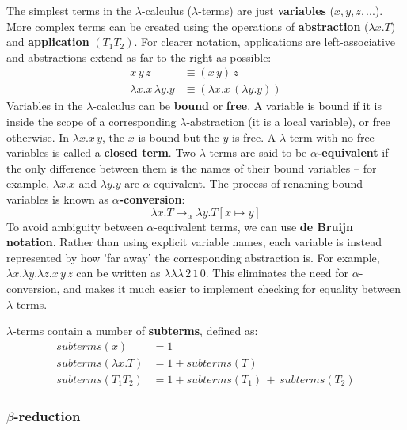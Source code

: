 \documentclass[11pt]{article}
\begin{document}
The simplest terms in the $\lambda$-calculus ($\lambda$-terms) are just \textbf{variables} ($x, y, z, ...$). More complex terms can be created using the operations of \textbf{abstraction} ($\lambda x. T$) and \textbf{application} $(T_1 T_2)$. For clearer notation, applications are left-associative and abstractions extend as far to the right as possible:
%
\begin{align*}
    x \, y \, z &\equiv (x \, y) \, z \\
    \lambda x. x \, \lambda y. y &\equiv (\lambda x. x \, (\lambda y. y))
\end{align*}
%
Variables in the $\lambda$-calculus can be \textbf{bound} or \textbf{free}. A variable is bound if it is inside the scope of a corresponding $\lambda$-abstraction (it is a local variable), or free otherwise. In $\lambda x. x \, y$, the $x$ is bound but the $y$ is free. A $\lambda$-term with no free variables is called a \textbf{closed term}. Two $\lambda$-terms are said to be \textbf{$\alpha$-equivalent} if the only difference between them is the names of their bound variables -- for example, $\lambda x. x$ and $\lambda y. y$ are $\alpha$-equivalent. The process of renaming bound variables is known as \textbf{$\alpha$-conversion}:
%
$$\lambda x. T \to_\alpha \lambda y. T[x \mapsto y]$$
%
To avoid ambiguity between $\alpha$-equivalent terms, we can use \textbf{de Bruijn notation}. Rather than using explicit variable names, each variable is instead represented by how 'far away' the corresponding abstraction is. For example, $\lambda x. \lambda y. \lambda z. x \, y \, z$ can be written as $\lambda\lambda\lambda \, 2 \, 1 \, 0$. This eliminates the need for $\alpha$-conversion, and makes it much easier to implement checking for equality between $\lambda$-terms.

$\lambda$-terms contain a number of \textbf{subterms}, defined as:
%
\begin{align*}
    subterms(x) &= 1 \\
    subterms(\lambda x. T) &= 1 + subterms(T) \\
    subterms(T_1 T_2) &= 1 + subterms(T_1) \, + \, subterms(T_2)
\end{align*}

\subsubsection{\texorpdfstring{$\beta$}{Beta}-reduction}
\end{document}
